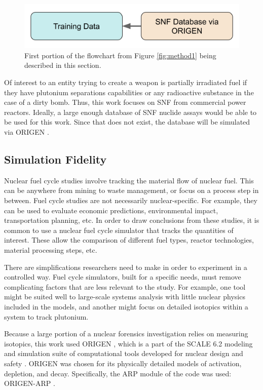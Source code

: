 \begin{figure}[H]
  \centering
  \includegraphics[width=0.7\linewidth]{./chapters/exp1/methodology1_1.png}
  \caption{First portion of the flowchart from Figure \ref{fig:method1} being 
           described in this section.}
\end{figure}

Of interest to an entity trying to create a weapon is partially irradiated fuel
if they have plutonium separations capabilities or any radioactive substance in
the case of a dirty bomb. Thus, this work focuses on \gls{SNF} from commercial
power reactors. Ideally, a large enough database of \gls{SNF} nuclide assays
would be able to be used for this work. Since that does not exist, the 
database will be simulated via \gls{ORIGEN} \cite{origen, origenarp}.  

\subsection{Simulation Fidelity}
\label{sec:fidelity}

Nuclear fuel cycle studies involve tracking the material flow of nuclear fuel.
This can be anywhere from mining to waste management, or focus on a process
step in between. Fuel cycle studies are not necessarily nuclear-specific. For
example, they can be used to evaluate economic predictions, environmental
impact, transportation planning, etc.  In order to draw conclusions from these
studies, it is common to use a nuclear fuel cycle simulator that tracks the
quantities of interest. These allow the comparison of different fuel types,
reactor technologies, material processing steps, etc. 

There are simplifications researchers need to make in order to experiment in a
controlled way. Fuel cycle simulators, built for a specific needs, must remove
complicating factors that are less relevant to the study.  For example, one
tool might be suited well to large-scale systems analysis with little nuclear
physics included in the models, and another might focus on detailed isotopics
within a system to track plutonium.

Because a large portion of a nuclear forensics investigation relies on
measuring isotopics, this work used \gls{ORIGEN} \cite{origen}, which is a part
of the \gls{SCALE} 6.2 modeling and simulation suite of computational tools
developed for nuclear design and safety \cite{scale}. \gls{ORIGEN} was chosen
for its physically detailed models of activation, depletion, and decay.
Specifically, the ARP module of the code was used: \gls{ORIGEN-ARP}
\cite{origenarp}.

